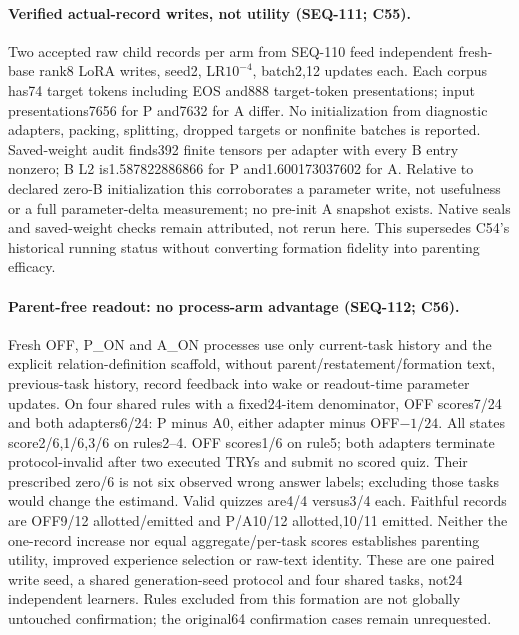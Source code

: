 \documentclass{article}
\begin{document}
\paragraph{Verified actual-record writes, not utility (SEQ-111; C55).} Two accepted raw child records per arm from SEQ-110 feed independent fresh-base rank8 LoRA writes, seed2, LR$10^{-4}$, batch2,12 updates each. Each corpus has74 target tokens including EOS and888 target-token presentations; input presentations7656 for P and7632 for A differ. No initialization from diagnostic adapters, packing, splitting, dropped targets or nonfinite batches is reported. Saved-weight audit finds392 finite tensors per adapter with every B entry nonzero; B L2 is1.587822886866 for P and1.600173037602 for A. Relative to declared zero-B initialization this corroborates a parameter write, not usefulness or a full parameter-delta measurement; no pre-init A snapshot exists. Native seals and saved-weight checks remain attributed, not rerun here. This supersedes C54's historical running status without converting formation fidelity into parenting efficacy.

\paragraph{Parent-free readout: no process-arm advantage (SEQ-112; C56).} Fresh OFF, P\_ON and A\_ON processes use only current-task history and the explicit relation-definition scaffold, without parent/restatement/formation text, previous-task history, record feedback into wake or readout-time parameter updates. On four shared rules with a fixed24-item denominator, OFF scores7/24 and both adapters6/24: P minus A0, either adapter minus OFF$-1/24$. All states score2/6,1/6,3/6 on rules2--4. OFF scores1/6 on rule5; both adapters terminate protocol-invalid after two executed TRYs and submit no scored quiz. Their prescribed zero/6 is not six observed wrong answer labels; excluding those tasks would change the estimand. Valid quizzes are4/4 versus3/4 each. Faithful records are OFF9/12 allotted/emitted and P/A10/12 allotted,10/11 emitted. Neither the one-record increase nor equal aggregate/per-task scores establishes parenting utility, improved experience selection or raw-text identity. These are one paired write seed, a shared generation-seed protocol and four shared tasks, not24 independent learners. Rules excluded from this formation are not globally untouched confirmation; the original64 confirmation cases remain unrequested.
\end{document}
